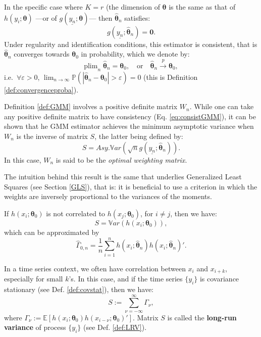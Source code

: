 \documentclass[
  12pt,
]{book}
\theoremstyle{definition}
\theoremstyle{definition}
\theoremstyle{definition}
\theoremstyle{definition}
\theoremstyle{remark}
\begin{document}
In the specific case where \(K = r\) (the dimension of \(\boldsymbol\theta\) is the same as that of \(h(y_i;\boldsymbol\theta)\) ---or of \(g(\underline{y_n};\boldsymbol\theta)\)--- then \(\hat{\boldsymbol\theta}_n\) satisfies:
\[
g(\underline{y_n};\hat{\boldsymbol\theta}_n) = \mathbf{0}.
\]
Under regularity and identification conditions, this estimator is consistent, that is \(\hat{\boldsymbol\theta}_{n}\) converges towards \(\boldsymbol\theta_0\) in probability, which we denote by:
\begin{equation}
\mbox{plim}_n\;\hat{\boldsymbol\theta}_{n}= \boldsymbol\theta_0,\quad \mbox{or} \quad\hat{\boldsymbol\theta}_{n} \overset{p}{\rightarrow} \boldsymbol\theta_0,\label{eq:consistGMM}
\end{equation}
i.e.~\(\forall \varepsilon>0\), \(\lim_{n \rightarrow \infty} \mathbb{P}(|\hat{\boldsymbol\theta}_{n} - \boldsymbol\theta_0|>\varepsilon) = 0\) (this is Definition \ref{def:convergenceproba}).

Definition \ref{def:GMM} involves a positive definite matrix \(W_n\). While one can take any positive definite matrix to have consistency (Eq. \eqref{eq:consistGMM}), it can be shown that he GMM estimator achieves the minimum asymptotic variance when \(W_n\) is the inverse of matrix \(S\), the latter being defined by:
\[
S = Asy.\mathbb{V}ar\left(\sqrt{n}g(\underline{y_n};\hat{\boldsymbol\theta}_n)\right).
\]
In this case, \(W_n\) is said to be the \emph{optimal weighting matrix}.

The intuition behind this result is the same that underlies Generalized Least Squares (see Section \ref{GLS}), that is: it is beneficial to use a criterion in which the weights are inversely proportional to the variances of the moments.

If \(h(x_i;\boldsymbol\theta_0)\) is not correlated to \(h(x_j;\boldsymbol\theta_0)\), for \(i \ne j\), then we have:
\[
S = \mathbb{V}ar(h(x_i;\boldsymbol\theta_0)),
\]
which can be approximated by
\[
\hat{\Gamma}_{0,n}=\frac{1}{n}\sum_{i=1}^{n} h(x_i;\hat{\boldsymbol\theta}_n)h(x_{i};\hat{\boldsymbol\theta}_n)'.
\]

In a time series context, we often have correlation between \(x_i\) and \(x_{i+k}\), especially for small \(k\)'s. In this case, and if the time series \(\{y_i\}\) is covariance stationary (see Def. \ref{def:covstat}), then we have:
\[
S := \sum_{\nu = -\infty}^{\infty} \Gamma_\nu,
\]
where \(\Gamma_\nu := \mathbb{E}[h(x_i;\boldsymbol\theta_0) h(x_{i-\nu};\boldsymbol\theta_0)']\). Matrix \(S\) is called the \textbf{long-run variance} of process \(\{y_i\}\) (see Def. \ref{def:LRV}).
\end{document}
